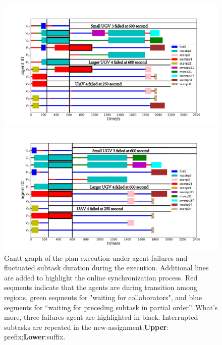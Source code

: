  
\begin{figure}[t]
	  \begin{minipage}[t]{1\linewidth}
		\includegraphics[height =0.6\textwidth]{figures/simulation/taskfinal/gantt_online_prefix.pdf}
	\end{minipage}%
	
	\begin{minipage}[t]{1\linewidth}
		\centering
		\includegraphics[width =1.05\textwidth]{ figures/simulation/taskfinal/gantt_online_suffix.pdf}
	\end{minipage}%
	\centering
	\caption{
Gantt graph of the plan execution under agent failures and fluctuated subtask duration during the execution.
Additional lines are added to highlight the online synchronization process. Red seqments indicate that the agents
are during transition among regions, green seqments for "waiting for collaborators", and blue segments for 
“waiting for preceding subtask in partial order”. What's more, three failures agent are highlighted in black.
Interrupted subtasks are repeated in the new-assignment.\textbf{Upper}: prefix;\textbf{Lower}:suffix.}
        \label{fig:online-failure-task}
\end{figure}


